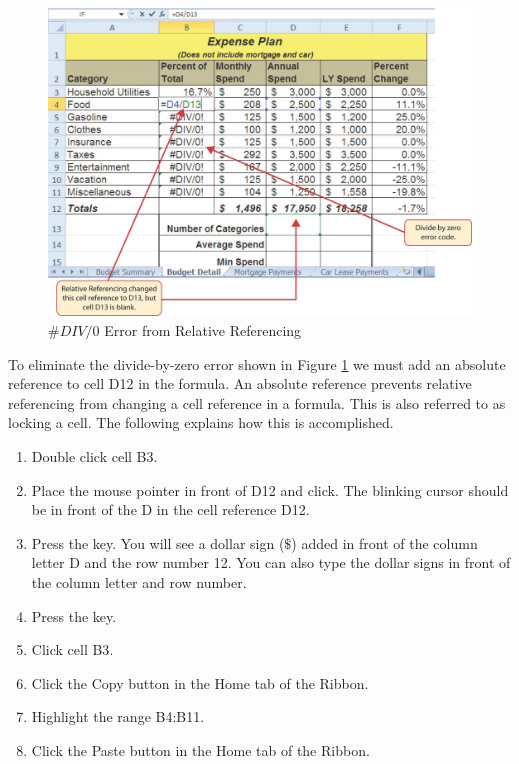 \begin{figure}[H]
	\centering
	\includegraphics[width=\maxwidth{.95\linewidth}]{gfx/ch02_fig15}
	\caption{$ \#DIV/0 $ Error from Relative Referencing}
	\label{02:fig15}
\end{figure}

To eliminate the divide-by-zero error shown in Figure \ref{02:fig15} we must add an absolute reference to cell \textsf{D12} in the formula. An absolute reference prevents relative referencing from changing a cell reference in a formula. This is also referred to as locking a cell. The following explains how this is accomplished.

\begin{enumerate}
	\item Double click cell \textsf{B3}.
	\item Place the mouse pointer in front of \textsf{D12} and click. The blinking cursor should be in front of the D in the cell reference \textsf{D12}.
	\item Press the  key. You will see a dollar sign ($ \$ $) added in front of the column letter D and the row number 12. You can also type the dollar signs in front of the column letter and row number.
	\item Press the  key.
	\item Click cell \textsf{B3}.
	\item Click the Copy button in the Home tab of the Ribbon.
	\item Highlight the range \textsf{B4:B11}.
	\item Click the Paste button in the Home tab of the Ribbon.
\end{enumerate}

